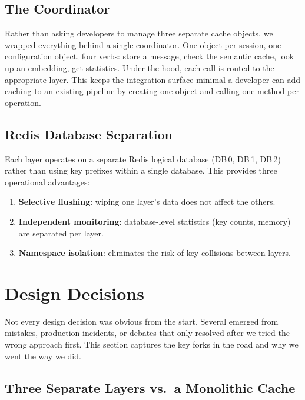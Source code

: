 \documentclass[conference]{IEEEtran}
\begin{document}
\subsection{The Coordinator}

Rather than asking developers to manage three separate cache objects, we wrapped everything behind a single coordinator. One object per session, one configuration object, four verbs: store a message, check the semantic cache, look up an embedding, get statistics. Under the hood, each call is routed to the appropriate layer. This keeps the integration surface minimal-a developer can add caching to an existing pipeline by creating one object and calling one method per operation.

\subsection{Redis Database Separation}

Each layer operates on a separate Redis logical database (DB\,0, DB\,1, DB\,2) rather than using key prefixes within a single database. This provides three operational advantages:

\begin{enumerate}
\item \textbf{Selective flushing}: wiping one layer's data does not affect the others.
\item \textbf{Independent monitoring}: database-level statistics (key counts, memory) are separated per layer.
\item \textbf{Namespace isolation}: eliminates the risk of key collisions between layers.
\end{enumerate}

\section{Design Decisions}
\label{sec:design}

Not every design decision was obvious from the start. Several emerged from mistakes, production incidents, or debates that only resolved after we tried the wrong approach first. This section captures the key forks in the road and why we went the way we did.

\subsection{Three Separate Layers vs.\ a Monolithic Cache}
\end{document}
